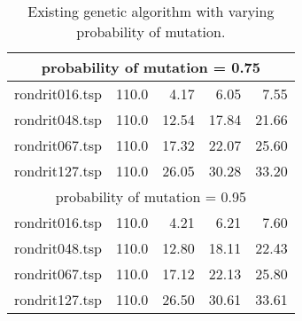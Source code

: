 \begin{table}[H]
{\begin{tabular}{l rrrr}
\multicolumn{5}{c}{probability of mutation = 0.75}\\ 
\midrule
rondrit016.tsp & 110.0 & 4.17 & 6.05 & 7.55 \\
rondrit048.tsp & 110.0 & 12.54 & 17.84 & 21.66 \\
rondrit067.tsp & 110.0 & 17.32 & 22.07 & 25.60 \\
rondrit127.tsp & 110.0 & 26.05 & 30.28 & 33.20 \\
\midrule
\multicolumn{5}{c}{probability of mutation = 0.95}\\ 
\midrule
rondrit016.tsp & 110.0 & 4.21 & 6.21 & 7.60 \\
rondrit048.tsp & 110.0 & 12.80 & 18.11 & 22.43 \\
rondrit067.tsp & 110.0 & 17.12 & 22.13 & 25.80 \\
rondrit127.tsp & 110.0 & 26.50 & 30.61 & 33.61 \\
\bottomrule 
\end{tabular} 
}
\caption{Existing genetic algorithm with varying probability of mutation.}
\label{tab:vary_mutation}
\end{table}
